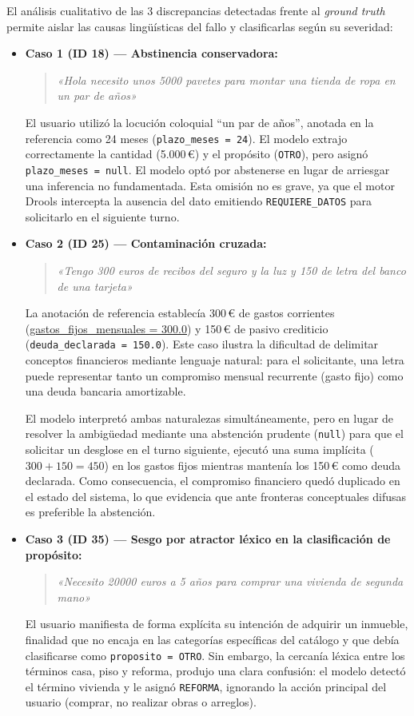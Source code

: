 \documentclass[12pt,a4paper]{report}
\begin{document}
El análisis cualitativo de las 3 discrepancias detectadas frente al \textit{ground truth} permite aislar las causas lingüísticas del fallo y clasificarlas según su severidad:

\begin{itemize}
    \item \textbf{Caso 1 (ID 18) --- Abstinencia conservadora:}
    \begin{quote}
        \textit{«Hola necesito unos 5000 pavetes para montar una tienda de ropa en un par de años»}
    \end{quote}
    El usuario utilizó la locución coloquial ``un par de años'', anotada en la referencia como 24 meses (\texttt{plazo\_meses = 24}). El modelo extrajo correctamente la cantidad (5.000\,€) y el propósito (\texttt{OTRO}), pero asignó \texttt{plazo\_meses = null}. El modelo optó por abstenerse en lugar de arriesgar una inferencia no fundamentada. Esta omisión no es grave, ya que el motor Drools intercepta la ausencia del dato emitiendo \texttt{REQUIERE\_DATOS} para solicitarlo en el siguiente turno.

    \item \textbf{Caso 2 (ID 25) --- Contaminación cruzada:}
    \begin{quote}
        \textit{«Tengo 300 euros de recibos del seguro y la luz y 150 de letra del banco de una tarjeta»}
    \end{quote}
    La anotación de referencia establecía 300\,€ de gastos corrientes (\url{gastos\_fijos\_mensuales = 300.0}) y 150\,€ de pasivo crediticio (\texttt{deuda\_declarada = 150.0}). Este caso ilustra la dificultad de delimitar conceptos financieros mediante lenguaje natural: para el solicitante, una letra puede representar tanto un compromiso mensual recurrente (gasto fijo) como una deuda bancaria amortizable. 
    
    El modelo interpretó ambas naturalezas simultáneamente, pero en lugar de resolver la ambigüedad mediante una abstención prudente (\texttt{null}) para que el solicitar un desglose en el turno siguiente, ejecutó una suma implícita ($300 + 150 = 450$) en los gastos fijos mientras mantenía los 150\,€ como deuda declarada. Como consecuencia, el compromiso financiero quedó duplicado en el estado del sistema, lo que evidencia que ante fronteras conceptuales difusas es preferible la abstención.

    \item \textbf{Caso 3 (ID 35) --- Sesgo por atractor léxico en la clasificación de propósito:}
    \begin{quote}
        \textit{«Necesito 20000 euros a 5 años para comprar una vivienda de segunda mano»}
    \end{quote}
    
    El usuario manifiesta de forma explícita su intención de adquirir un inmueble, finalidad que no encaja en las categorías específicas del catálogo y que debía clasificarse como \texttt{proposito = OTRO}. Sin embargo, la cercanía léxica entre los términos casa, piso y reforma, produjo una clara confusión: el modelo detectó el término vivienda y le asignó \texttt{REFORMA}, ignorando la acción principal del usuario (comprar, no realizar obras o arreglos).
\end{itemize}
\end{document}
